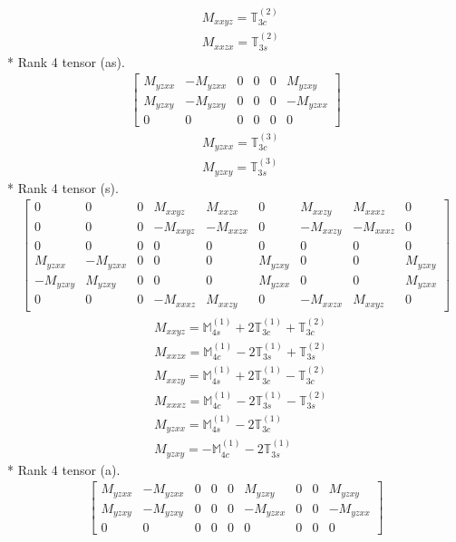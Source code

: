 \documentclass[fleqn,8pt,landscape]{jsarticle}
\begin{document}
\begin{align*}
& M_{xxyz} = \mathbb{T}_{3c}^{(2)} \\
& M_{xxzx} = \mathbb{T}_{3s}^{(2)}
\end{align*}
* Rank 4 tensor (as).
\begin{align*}
\begin{bmatrix} M_{yzxx} & - M_{yzxx} & 0 & 0 & 0 & M_{yzxy} \\ M_{yzxy} & - M_{yzxy} & 0 & 0 & 0 & - M_{yzxx} \\ 0 & 0 & 0 & 0 & 0 & 0 \end{bmatrix}
\end{align*}
\begin{align*}
& M_{yzxx} = \mathbb{T}_{3c}^{(3)} \\
& M_{yzxy} = \mathbb{T}_{3s}^{(3)}
\end{align*}
* Rank 4 tensor (s).
\begin{align*}
\begin{bmatrix} 0 & 0 & 0 & M_{xxyz} & M_{xxzx} & 0 & M_{xxzy} & M_{xxxz} & 0 \\ 0 & 0 & 0 & - M_{xxyz} & - M_{xxzx} & 0 & - M_{xxzy} & - M_{xxxz} & 0 \\ 0 & 0 & 0 & 0 & 0 & 0 & 0 & 0 & 0 \\ M_{yzxx} & - M_{yzxx} & 0 & 0 & 0 & M_{yzxy} & 0 & 0 & M_{yzxy} \\ - M_{yzxy} & M_{yzxy} & 0 & 0 & 0 & M_{yzxx} & 0 & 0 & M_{yzxx} \\ 0 & 0 & 0 & - M_{xxxz} & M_{xxzy} & 0 & - M_{xxzx} & M_{xxyz} & 0 \end{bmatrix}
\end{align*}
\begin{align*}
& M_{xxyz} = \mathbb{M}_{4s}^{(1)} + 2 \mathbb{T}_{3c}^{(1)} + \mathbb{T}_{3c}^{(2)} \\
& M_{xxzx} = \mathbb{M}_{4c}^{(1)} - 2 \mathbb{T}_{3s}^{(1)} + \mathbb{T}_{3s}^{(2)} \\
& M_{xxzy} = \mathbb{M}_{4s}^{(1)} + 2 \mathbb{T}_{3c}^{(1)} - \mathbb{T}_{3c}^{(2)} \\
& M_{xxxz} = \mathbb{M}_{4c}^{(1)} - 2 \mathbb{T}_{3s}^{(1)} - \mathbb{T}_{3s}^{(2)} \\
& M_{yzxx} = \mathbb{M}_{4s}^{(1)} - 2 \mathbb{T}_{3c}^{(1)} \\
& M_{yzxy} = - \mathbb{M}_{4c}^{(1)} - 2 \mathbb{T}_{3s}^{(1)}
\end{align*}
* Rank 4 tensor (a).
\begin{align*}
\begin{bmatrix} M_{yzxx} & - M_{yzxx} & 0 & 0 & 0 & M_{yzxy} & 0 & 0 & M_{yzxy} \\ M_{yzxy} & - M_{yzxy} & 0 & 0 & 0 & - M_{yzxx} & 0 & 0 & - M_{yzxx} \\ 0 & 0 & 0 & 0 & 0 & 0 & 0 & 0 & 0 \end{bmatrix}
\end{align*}
\end{document}
